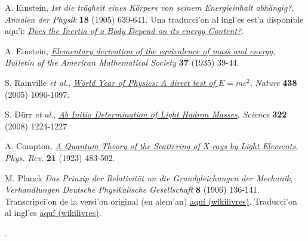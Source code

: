 \begin{thebibliography}{99}
 A. Einstein, \textit{Ist die tr\"agheit eines K\"orpers von seinem Energieinhalt abh\"angig?}, {\sl Annalen der Physik} {\bf 18} (1905) 639-641. Una traducci'on al ingl'es est'a disponible aqu'i: \href{{https://www.fourmilab.ch/etexts/einstein/E_mc2/e_mc2.pdf}}{\textit{Does the Inertia of a Body Depend on its energy Content?}}.

 A. Einstein, \href{http://www.ams.org/journals/bull/2000-37-01/S0273-0979-99-00805-8/S0273-0979-99-00805-8.pdf}
{\textit{Elementary derivation of the equivalence of mass and energy}}, {\sl Bulletin of the American Mathematical Society} {\bf 37} (1935) 39-44.

 S. Rainville \textit{et al.}, \href{http://www.nature.com/nature/journal/v438/n7071/full/4381096a.html}{\it World Year of Physics: A direct test of $E=mc^2$}, {\sl Nature} {\bf 438} (2005) 1096-1097.

 S. Dürr \textit{et al.}, \href{http://www.sciencemag.org/content/322/5905/1224.full}{\it Ab Initio Determination of Light Hadron Masses}, {\sl Science} {\bf 322} (2008) 1224-1227

 A. Compton, \href{http://prola.aps.org/abstract/PR/v21/i5/p483_1}{\it A Quantum Theory of the Scattering of X-rays by Light Elements}, {\sl Phys. Rev.} {\bf 21} (1923) 483-502.

 M. Planck {\it Das Prinzip der Relativit\"at un die Grundgleichungen der Mechanik}, {\sl Verhandlungen Deutsche Physikalische Gesellschaft} {\bf 8} (1906) 136-141. Transcripci'on de la versi'on original (en alem'an) \href{http://wikilivres.ca/wiki/Das_Prinzip_der_Relativit\%C3\%A4t_und_die_Grundgleichungen_der_Mechanik}{aqu\'i (wikilivres)}. Traducci'on al ingl'es  \href{http://en.wikisource.org/wiki/Translation:The_Principle_of_Relativity_and_the_Fundamental_Equations_of_Mechanics}{aqu\'i (wikilivres)}.

\end{thebibliography}.
